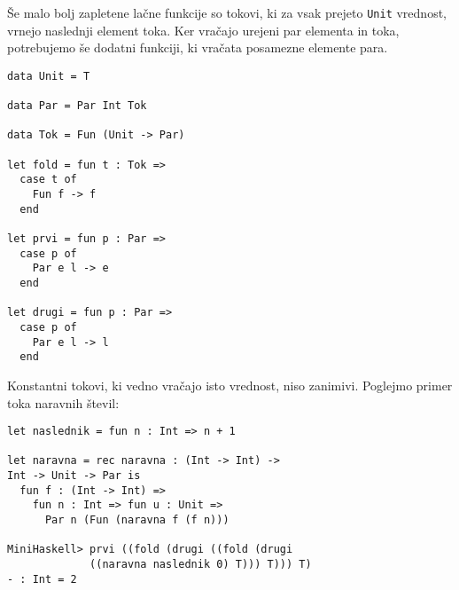 \documentclass[12pt,a4paper,openany]{book}
\begin{document}
Še malo bolj zapletene lačne funkcije so tokovi, ki za vsak prejeto \lstinline{Unit} vrednost, vrnejo naslednji element toka. Ker vračajo urejeni 
par elementa in toka, potrebujemo še dodatni funkciji, ki vračata posamezne elemente para.
\begin{lstlisting}
data Unit = T

data Par = Par Int Tok

data Tok = Fun (Unit -> Par)

let fold = fun t : Tok =>
  case t of
    Fun f -> f
  end

let prvi = fun p : Par =>
  case p of
    Par e l -> e
  end

let drugi = fun p : Par =>
  case p of
    Par e l -> l
  end
\end{lstlisting}
Konstantni tokovi, ki vedno vračajo isto vrednost, niso zanimivi. Poglejmo 
primer toka naravnih števil:
\begin{lstlisting}
let naslednik = fun n : Int => n + 1

let naravna = rec naravna : (Int -> Int) -> 
Int -> Unit -> Par is
  fun f : (Int -> Int) =>
    fun n : Int => fun u : Unit =>
      Par n (Fun (naravna f (f n)))

MiniHaskell> prvi ((fold (drugi ((fold (drugi 
             ((naravna naslednik 0) T))) T))) T)
- : Int = 2
\end{lstlisting}
\end{document}

